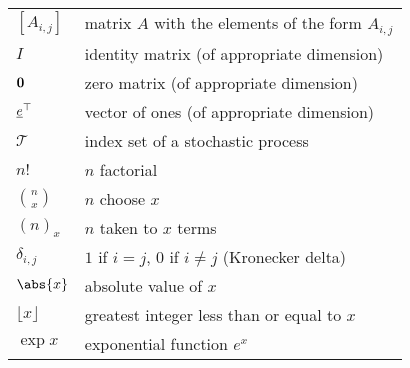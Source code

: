 \begin{tabular}{ll}
    $ [A_{i,j}] $        & matrix $ A $ with the elements of the form $ A_{i,j} $  \\
    $ I $                & identity matrix (of appropriate dimension)              \\
    $ \bm{0} $       & zero matrix (of appropriate dimension)                  \\
    $ \underline{e}^\top $  & vector of ones (of appropriate dimension)               \\
    $ \mathcal{T} $      & index set of a stochastic process                       \\
    $ n! $               & $ n $ factorial                                         \\
    $ \binom{n}{x} $     & $ n $ choose $ x $                                      \\
    $ (n)_x $            & $ n $ taken to $ x $ terms                              \\
    $ \delta_{i,j} $     & $ 1 $ if $ i=j $, $ 0 $ if $ i\ne j $ (Kronecker delta) \\
    $ \abs{x} $          & absolute value of $ x $                                 \\
    $ \lfloor x\rfloor $ & greatest integer less than or equal to $ x $            \\
    $ \exp{x} $          & exponential function $ e^{x} $
\end{tabular}
\newpage
